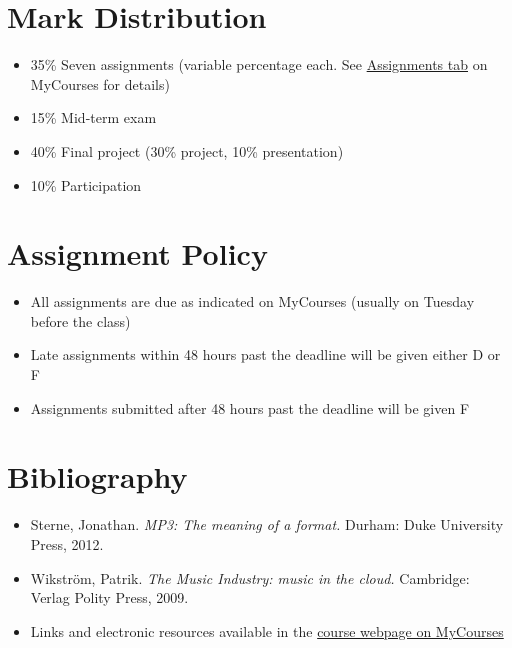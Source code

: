 \documentclass[11pt]{amsart}
\begin{document}
\section{Mark Distribution}
\begin{itemize}
\item 35\% Seven assignments (variable percentage each. See \href{https://mycourses2.mcgill.ca/d2l/lms/dropbox/user/folders_list.d2l?ou=230934&isprv=0}{Assignments tab} on MyCourses for details)
\item 15\% Mid-term exam
\item 40\% Final project (30\% project, 10\% presentation)
\item 10\% Participation
\end{itemize}

\section{Assignment Policy}
\begin{itemize}
\item All assignments are due as indicated on MyCourses (usually on Tuesday before the class)
\item Late assignments within 48 hours past the deadline will be given either D or F
\item Assignments submitted after 48 hours past the deadline will be given F
\end{itemize}

\section{Bibliography}
\begin{itemize}
\item Sterne, Jonathan. \emph{MP3: The meaning of a format.} Durham: Duke University Press, 2012.
\item Wikstr\"{o}m, Patrik. \emph{The Music Industry: music in the cloud.} Cambridge: Verlag Polity Press, 2009.
\item Links and electronic resources available in the \href{https://mycourses2.mcgill.ca/d2l/lms/links/view_links.d2l?ou=186686&d2l_stateScopes=%7B1%3A%5B%27gridpagenum%27,%27search%27,%27pagenum%27%5D,2%3A%5B%27lcs%27%5D,3%3A%5B%27grid%27,%27pagesize%27,%27htmleditor%27,%27hpg%27%5D%7D&d2l_stateGroups=%5B%27page%27%5D&d2l_statePageId=499&d2l_state_page=%7B%27Name%27%3A%27page%27,%27Controls%27%3A%5B%7B%27ControlId%27%3A%7B%27ID%27%3A%27slctlst_category%27%7D,%27StateType%27%3A%27%27,%27Key%27%3A%27%27,%27Name%27%3A%27category%27,%27State%27%3A%7B%27SelectedKey%27%3A%270%27,%27SelectedVal%27%3A%270%27%7D%7D%5D%7D&d2l_change=0#20825}{course webpage on MyCourses}

\end{itemize}
\end{document}
